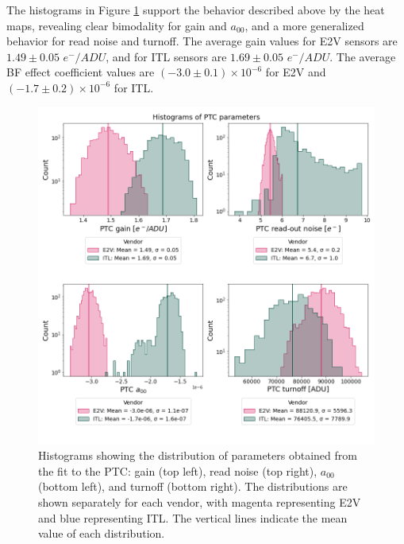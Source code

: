 \vspace{3mm}
The histograms in Figure \ref{fig:Histogram_PTC} support the behavior described above by the heat maps, revealing clear bimodality for gain and $a_{00}$, and a more generalized behavior for read noise and turnoff. The average gain values for E2V sensors are $1.49 \pm 0.05$ $e^{-}/ADU$, and for ITL sensors are $1.69 \pm 0.05$ $e^{-}/ADU$. The average BF effect coefficient values are $(-3.0 \pm 0.1)\times 10 ^{-6}$ for E2V and $(-1.7 \pm 0.2)\times 10 ^{-6}$ for ITL.

\vspace{3mm}

\begin{figure}[!htb]
    \centering
    \includegraphics[width=\textwidth]{Figures/Histograms_PTC.png}
    \caption{Histograms showing the distribution of parameters obtained from the fit to the PTC: gain (top left), read noise (top right), $a_{00}$ (bottom left), and turnoff (bottom right). The distributions are shown separately for each vendor, with magenta representing E2V and blue representing ITL. The vertical lines indicate the mean value of each distribution.}
    \label{fig:Histogram_PTC}
\end{figure}

